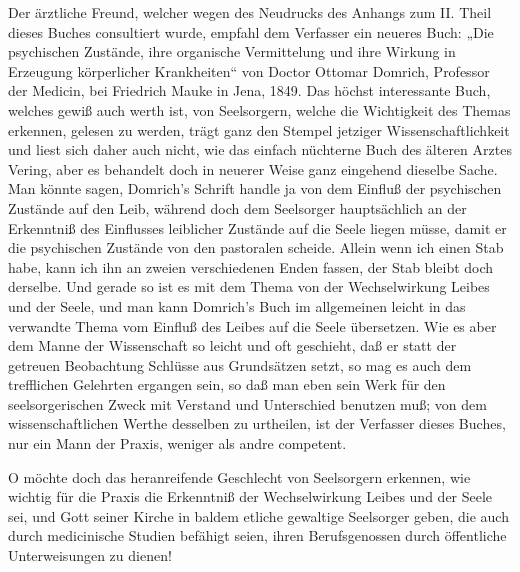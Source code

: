 Der ärztliche Freund, welcher wegen des Neudrucks des Anhangs zum II. Theil dieses Buches consultiert wurde, empfahl dem Verfasser ein neueres Buch: „Die psychischen Zustände, ihre organische Vermittelung und ihre Wirkung in Erzeugung körperlicher Krankheiten“ von Doctor Ottomar Domrich, Professor der Medicin, bei Friedrich Mauke in Jena, 1849. Das höchst interessante Buch, welches gewiß auch werth ist, von Seelsorgern, welche die Wichtigkeit des Themas erkennen, gelesen zu werden, trägt ganz den Stempel jetziger Wissenschaftlichkeit und liest sich daher auch nicht, wie das einfach nüchterne Buch des älteren Arztes Vering, aber es behandelt doch in neuerer Weise ganz eingehend dieselbe Sache. Man könnte sagen, Domrich’s Schrift handle ja von dem Einfluß der psychischen Zustände auf den Leib, während doch dem Seelsorger hauptsächlich an der Erkenntniß des Einflusses
leiblicher Zustände auf die Seele liegen müsse, damit er die psychischen Zustände von den pastoralen scheide. Allein wenn ich einen Stab habe, kann ich ihn an zweien verschiedenen Enden fassen, der Stab bleibt doch derselbe. Und gerade so ist es mit dem Thema von der Wechselwirkung Leibes und der Seele, und man kann Domrich’s Buch im allgemeinen leicht in das verwandte Thema vom Einfluß des Leibes auf die Seele übersetzen. Wie es aber dem Manne der Wissenschaft so leicht und oft geschieht, daß er statt der getreuen Beobachtung Schlüsse aus Grundsätzen setzt, so mag es auch dem trefflichen Gelehrten ergangen sein, so daß man eben sein Werk für den seelsorgerischen Zweck mit Verstand und Unterschied benutzen muß; von dem wissenschaftlichen Werthe desselben zu urtheilen, ist der Verfasser dieses Buches, nur ein Mann der Praxis, weniger als andre competent.

O möchte doch das heranreifende Geschlecht von Seelsorgern erkennen, wie wichtig für die Praxis die Erkenntniß der Wechselwirkung Leibes und der Seele sei, und Gott seiner Kirche in baldem etliche gewaltige Seelsorger geben, die auch durch medicinische Studien befähigt seien, ihren Berufsgenossen durch öffentliche Unterweisungen zu dienen!

